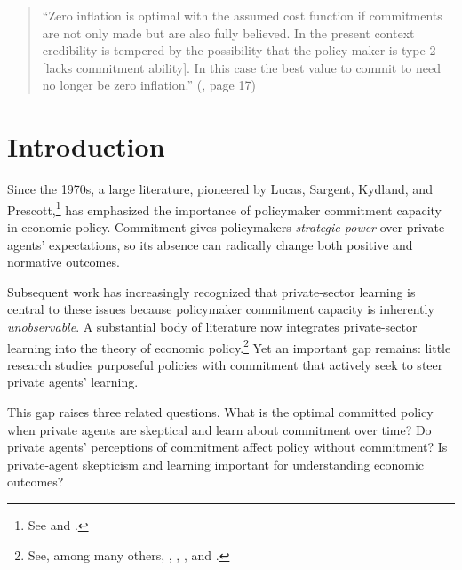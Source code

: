 \documentclass[12pt,letter,leqno]{article}
\theoremstyle{asn}
\theoremstyle{lem}
\theoremstyle{slem}
\theoremstyle{prop}
\theoremstyle{appprop}
\theoremstyle{rem}
\theoremstyle{defn}
\begin{document}
\baselineskip20pt 
\baselineskip17pt \thispagestyle{empty} 
\newpage \setcounter{page}{1}

\setcounter{page}{0}
\begin{quote}
{\color{webbrown} ``Zero inflation is optimal with the assumed cost function if commitments are not only made but are also fully believed. In the present context credibility is tempered by the possibility that the policy-maker is type 2 [lacks commitment ability]. In this case the best value to commit to need no longer be zero inflation.''}\newline
(\cite{barro_reputation_1986}, page 17)
\end{quote}

\section{Introduction}
\setcounter{page}{1}

\baselineskip17pt



Since the 1970s, a large literature, pioneered by Lucas, Sargent, Kydland, and
Prescott,\footnote{See \cite{lucas_after_1979} and \cite{kydland_rules_1977}.}
has emphasized the importance of policymaker commitment capacity in economic
policy. Commitment gives policymakers \textit{strategic power} over private
agents' expectations, so its absence can radically change both positive and
normative outcomes.

Subsequent work has increasingly recognized that private-sector learning is central to these issues because policymaker commitment capacity is inherently \textit{unobservable}. A substantial body of literature now integrates private-sector learning into the theory of economic policy.\footnote{See, among many others, \cite{barro_reputation_1986}, \cite{backus_rational_1985}, \cite{phelan_public_2006}, and \cite{dovis_reputation_2022}.} Yet an important gap remains: little research studies purposeful policies with commitment that actively seek to steer private agents' learning.

This gap raises three related questions. What is the optimal committed policy
when private agents are skeptical and learn about commitment over time? Do
private agents' perceptions of commitment affect policy without commitment? Is
private-agent skepticism and learning important for understanding economic outcomes?
\end{document}
